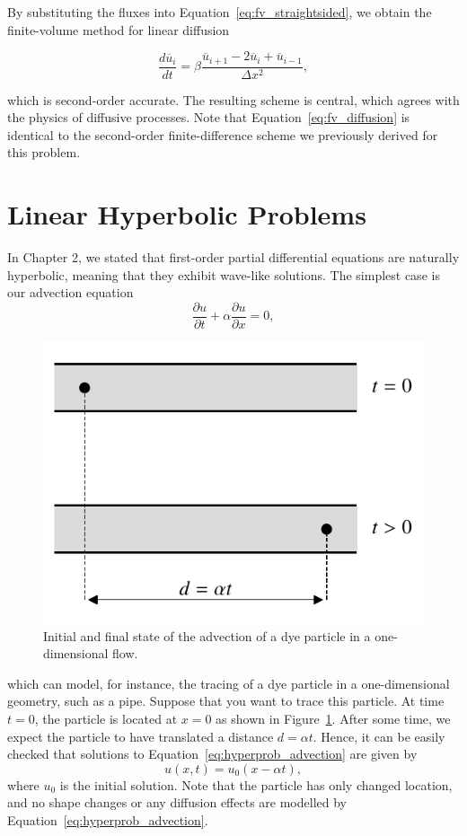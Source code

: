 By substituting the fluxes into Equation~\ref{eq:fv_straightsided}, we obtain the finite-volume method for linear diffusion
\begin{eqBox}
 \begin{equation}
 \frac{d\overline u_i}{dt} = \beta \frac{\overline u_{i+1}-2\overline u_{i} + \overline u_{i-1}}{\Delta x^2},
	\label{eq:fv_diffusion}
 \end{equation}
\end{eqBox}
which is second-order accurate. The resulting scheme is central, which agrees with the physics of diffusive processes.  Note that Equation~\ref{eq:fv_diffusion} is identical to the second-order finite-difference scheme we previously derived for this problem. 

\section{Linear Hyperbolic Problems} \label{sec:linear_hyperb_problems}
In Chapter 2, we stated that first-order partial differential equations are naturally hyperbolic, meaning that they exhibit wave-like solutions. The simplest case is our advection equation
\begin{equation}
	\frac{\partial u}{\partial t} + \alpha \frac{\partial u}{\partial x} = 0, 
	\label{eq:hyperprob_advection}
\end{equation}
\begin{figure}[htbp]
	\centering
	\includegraphics[width=0.5\linewidth]{Pictures/ch11_lsc_advection_dye}
	\caption{Initial and final state of the advection of a dye particle in a one-dimensional flow.}
	\label{fig:advection_dye}
\end{figure}
which can model, for instance, the tracing of a dye particle in a one-dimensional geometry, such as a pipe. Suppose that you want to trace this particle. At time $t=0$, the particle is located at $x=0$ as shown in Figure~\ref{fig:advection_dye}. After some time, we expect the particle to have translated a distance $d=\alpha t$. Hence, it can be easily checked that solutions to Equation~\ref{eq:hyperprob_advection} are given by
\begin{equation}
	u(x,t) = u_0 (x - \alpha t), 
\end{equation}
where $u_0$ is the initial solution. Note that the particle has only changed location, and no shape changes or any diffusion effects are modelled by Equation~\ref{eq:hyperprob_advection}.

